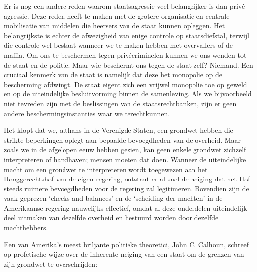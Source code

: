 \documentclass[
  a5paper,
  smalldemyvopaper,10pt,twoside,onecolumn,openright,extrafontsizes,hidelinks]{memoir}
\begin{document}
Er is nog een andere reden waarom staatsagressie veel belangrijker is
dan privé-agressie. Deze reden heeft te maken met de grotere organisatie
en centrale mobilisatie van middelen die heersers van de staat kunnen
opleggen. Het belangrijkste is echter de afwezigheid van enige controle
op staatsdiefstal, terwijl die controle wel bestaat wanneer we te maken
hebben met overvallers of de maffia. Om ons te beschermen tegen
privécriminelen kunnen we ons wenden tot de staat en de politie. Maar
wie beschermt ons tegen de staat zelf? Niemand. Een cruciaal kenmerk van
de staat is namelijk dat deze het monopolie op de bescherming afdwingt.
De staat eigent zich een vrijwel monopolie toe op geweld en op de
uiteindelijke besluitvorming binnen de samenleving. Als we bijvoorbeeld
niet tevreden zijn met de beslissingen van de staatsrechtbanken, zijn er
geen andere beschermingsinstanties waar we terechtkunnen.

Het klopt dat we, althans in de Verenigde Staten, een grondwet hebben
die strikte beperkingen oplegt aan bepaalde bevoegdheden van de
overheid. Maar zoals we in de afgelopen eeuw hebben gezien, kan geen
enkele grondwet zichzelf interpreteren of handhaven; mensen moeten dat
doen. Wanneer de uiteindelijke macht om een grondwet te interpreteren
wordt toegewezen aan het Hooggerechtshof van de eigen regering, ontstaat
er al snel de neiging dat het Hof steeds ruimere bevoegdheden voor de
regering zal legitimeren. Bovendien zijn de vaak geprezen `checks and
balances' en de `scheiding der machten' in de Amerikaanse regering
nauwelijks effectief, omdat al deze onderdelen uiteindelijk deel
uitmaken van dezelfde overheid en bestuurd worden door dezelfde
machthebbers.

Een van Amerika's meest briljante politieke theoretici, John C. Calhoun,
schreef op profetische wijze over de inherente neiging van een staat om
de grenzen van zijn grondwet te overschrijden:
\end{document}
